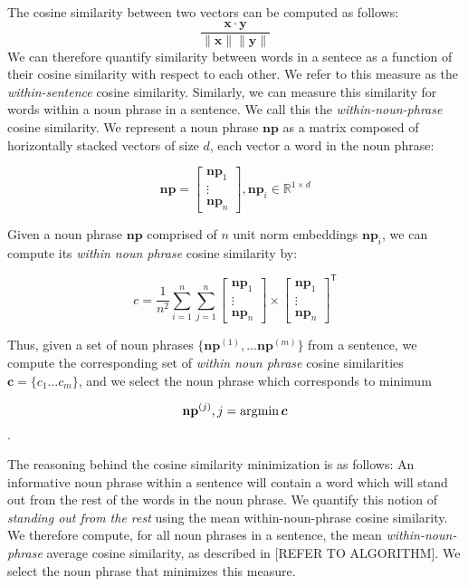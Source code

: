 The cosine similarity between two vectors can be computed as follows:
\[
  \frac{\mathbf{x} \cdot \mathbf{y}}{\lVert \mathbf{x} \rVert \lVert \mathbf{y} \rVert}
\]
We can therefore quantify similarity between words in a sentece as a function of their
cosine similarity with respect to each other. We refer to this measure as the \textit{within-sentence}
cosine similarity. Similarly, we can measure this similarity for words within a noun phrase
in a sentence. We call this the \textit{within-noun-phrase} cosine similarity.
We represent a noun phrase $\mathbf{np}$ as a matrix composed of horizontally stacked vectors of size $d$, each vector a word in the noun phrase:

\[\mathbf{np} = \begin{bmatrix}
    \bm{np}_{1}   \\
    \vdots \\
    \bm{np}_{n}
  \end{bmatrix},
\bm{np}_{i} \in \mathbb{R}^{1 \times d}\]

Given a noun phrase $\mathbf{np}$ comprised of $n$ unit norm embeddings $\bm{np}_i$, we can compute its \textit{within noun phrase} cosine similarity by:

\[c = \frac{1}{{n^2}} \sum_{i=1}^{n} \sum_{j=1}^{n} \begin{bmatrix}
    \bm{np}_{1}   \\
    \vdots \\
    \bm{np}_{n}
  \end{bmatrix} \times \begin{bmatrix}
      \bm{np}_{1}   \\
      \vdots \\
      \bm{np}_{n}
    \end{bmatrix}^\mathsf{T}\]

Thus, given a set of noun phrases $\{\mathbf{np}^{(1)}, \dots \mathbf{np}^{(m)}\}$ from a sentence, we compute the corresponding set of
\textit{within noun phrase} cosine similarities $\bm{c} = \{c_1 \dots c_m\}$, and we select the noun phrase which corresponds to minimum

\[\mathbf{np}^{(j)}, j = \operatorname*{\arg\!\min}{\bm{c}}\].

The reasoning behind the cosine similarity minimization is as follows: An informative
noun phrase within a sentence will contain a word which will stand out from the rest of the
words in the noun phrase. We quantify this notion of \textit{standing out from the rest} using the
mean within-noun-phrase cosine similarity. We therefore compute, for all noun phrases in a
sentence, the mean \textit{within-noun-phrase} average cosine similarity, as described in [REFER TO ALGORITHM].
We select the noun phrase that minimizes this measure.

